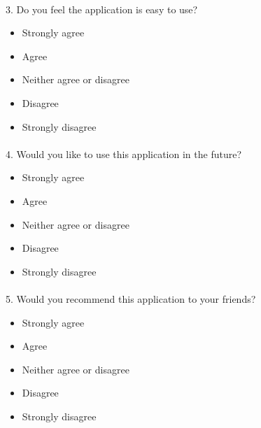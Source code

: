 \documentclass[12pt]{article}
\begin{document}
\paragraph{}

\paragraph{}3. Do you feel the application is easy to use?
\begin{itemize}
	\item Strongly agree
	\item Agree
	\item Neither agree or disagree
	\item Disagree
	\item Strongly disagree
\end{itemize}
\paragraph{}

\paragraph{}4. Would you like to use this application in the future?
\begin{itemize}
	\item Strongly agree
	\item Agree
	\item Neither agree or disagree
	\item Disagree
	\item Strongly disagree
\end{itemize}

\paragraph{}
\paragraph{}5. Would you recommend this application to your friends?
\begin{itemize}
	\item Strongly agree
	\item Agree
	\item Neither agree or disagree
	\item Disagree
	\item Strongly disagree
\end{itemize}
\end{document}

